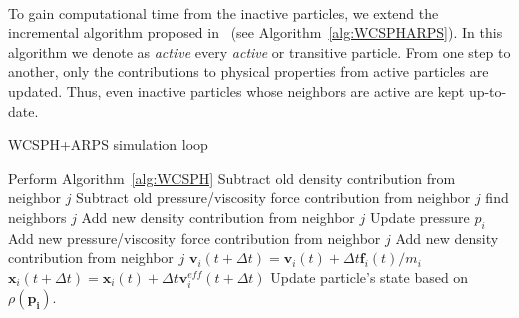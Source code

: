 \paragraph*{}
To gain computational time from the inactive particles, we extend the incremental algorithm proposed in~\cite{Artemova2012} (see Algorithm~\ref{alg:WCSPHARPS}).
In this algorithm we denote as \emph{active} every \emph{active} or {transitive} particle.
From one step to another, only the contributions to physical properties from active particles are updated. 
Thus, even inactive particles whose neighbors are active are kept up-to-date.

\newpage

\begin{algorithm}[H]
    \caption[ARPS: WCSPH+ARPS simulation]{WCSPH+ARPS simulation loop}
    \label{alg:WCSPHARPS}
    \begin{algorithmic}
        \State Perform Algorithm~\ref{alg:WCSPH}
        \Else
            \State Subtract old density contribution from neighbor $j$
	        \State Subtract old pressure/viscosity force contribution from neighbor $j$
            \EndFor
            \State find neighbors $j$
            \EndFor
            \State Add new density contribution from neighbor $j$
            \State Update pressure $p_{i}$
	        \State Add new pressure/viscosity force contribution from neighbor $j$
            \State Add new density contribution from neighbor $j$
            \EndFor
            \State $\mathbf{v}_{i}(t+\Delta t) = \mathbf{v}_{i}(t) + \Delta t \mathbf{f}_{i}(t)/m_{i}$
            \State $\mathbf{x}_{i}(t+\Delta t) = \mathbf{x}_{i}(t) + \Delta t \mathbf{v}^{eff}_{i}(t+\Delta t)$
            \State Update particle's state based on $\rho(\mathbf{p_{i}})$.
            \EndFor
        \EndIf
    \end{algorithmic}
\end{algorithm}

\newpage 


